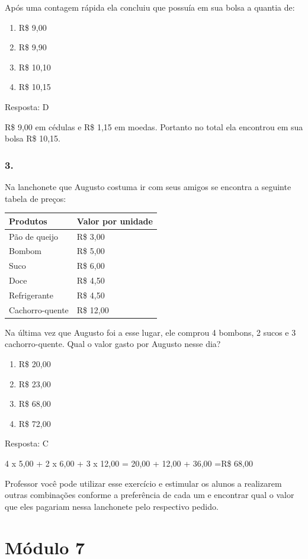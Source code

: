Após uma contagem rápida ela concluiu que possuía em sua bolsa a quantia
de:

\begin{enumerate}
\def\labelenumi{\alph{enumi})}
\item
  R\$ 9,00
\item
  R\$ 9,90
\item
  R\$ 10,10
\item
  R\$ 10,15
\end{enumerate}

Resposta: D

R\$ 9,00 em cédulas e R\$ 1,15 em moedas. Portanto no total ela
encontrou em sua bolsa R\$ 10,15.

\subsubsection{3.}\label{section-77}

Na lanchonete que Augusto costuma ir com seus amigos se encontra a
seguinte tabela de preços:

\begin{longtable}[]{@{}ll@{}}
\toprule
Produtos & Valor por unidade\tabularnewline
\midrule
\endhead
Pão de queijo & R\$ 3,00\tabularnewline
Bombom & R\$ 5,00\tabularnewline
Suco & R\$ 6,00\tabularnewline
Doce & R\$ 4,50\tabularnewline
Refrigerante & R\$ 4,50\tabularnewline
Cachorro-quente & R\$ 12,00\tabularnewline
\bottomrule
\end{longtable}

Na última vez que Augusto foi a esse lugar, ele comprou 4 bombons, 2
sucos e 3 cachorro-quente. Qual o valor gasto por Augusto nesse dia?

\begin{enumerate}
\def\labelenumi{\alph{enumi})}
\item
  R\$ 20,00
\item
  R\$ 23,00
\item
  R\$ 68,00
\item
  R\$ 72,00
\end{enumerate}

Resposta: C

4 x 5,00 + 2 x 6,00 + 3 x 12,00 = 20,00 + 12,00 + 36,00 =R\$ 68,00

Professor você pode utilizar esse exercício e estimular os alunos a
realizarem outras combinações conforme a preferência de cada um e
encontrar qual o valor que eles pagariam nessa lanchonete pelo
respectivo pedido.

\section{Módulo 7}\label{muxf3dulo-7}

